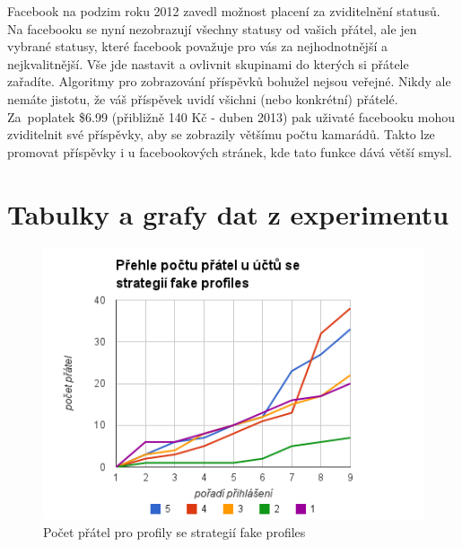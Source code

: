 \documentclass[thesis=M,czech]{FITthesis}[2013/05/10]
\begin{document}
Facebook na podzim roku 2012 zavedl možnost placení za zviditelnění statusů. Na facebooku se nyní nezobrazují všechny statusy od vašich přátel, ale jen vybrané statusy, které facebook považuje pro vás za nejhodnotnější a nejkvalitnější. Vše jde nastavit a ovlivnit skupinami do kterých si přátele zařadíte. Algoritmy pro zobrazování příspěvků bohužel nejsou veřejné. Nikdy ale nemáte jistotu, že váš příspěvek uvidí všichni (nebo konkrétní) přátelé. Za~poplatek \$6.99 (přibližně 140 Kč - duben 2013) pak uživaté facebooku mohou zviditelnit své příspěvky, aby se zobrazily většímu počtu kamarádů. Takto lze promovat příspěvky i u facebookových stránek, kde tato funkce dává větší smysl.







\appendix

\chapter{Tabulky a grafy dat z experimentu}


\begin{figure}[h]
\includegraphics[width=5in]{figures/levelFake.png}
\caption{Počet přátel pro profily se strategií fake profiles}
\label{fig:levelFake}
\end{figure}
\end{document}
